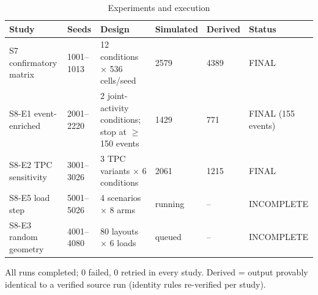 \begin{table}[t]\centering\caption{Experiments and execution}\label{tab:t1}\footnotesize
\begin{tabular}{llllll}\toprule
Study & Seeds & Design & Simulated & Derived & Status \\\midrule
S7 confirmatory matrix & 1001–1013 & 12 conditions × 536 cells/seed & 2579 & 4389 & FINAL \\
S8-E1 event-enriched & 2001–2220 & 2 joint-activity conditions; stop at $\ge$ 150 events & 1429 & 771 & FINAL (155 events) \\
S8-E2 TPC sensitivity & 3001–3026 & 3 TPC variants × 6 conditions & 2061 & 1215 & FINAL \\
S8-E5 load step & 5001–5026 & 4 scenarios × 8 arms & running & – & INCOMPLETE \\
S8-E3 random geometry & 4001–4080 & 80 layouts × 6 loads & queued & – & INCOMPLETE \\
\bottomrule\end{tabular}
\par\smallskip\parbox{\linewidth}{\scriptsize All runs completed; 0 failed, 0 retried in every study. Derived = output provably identical to a verified source run (identity rules re-verified per study).}\end{table}

